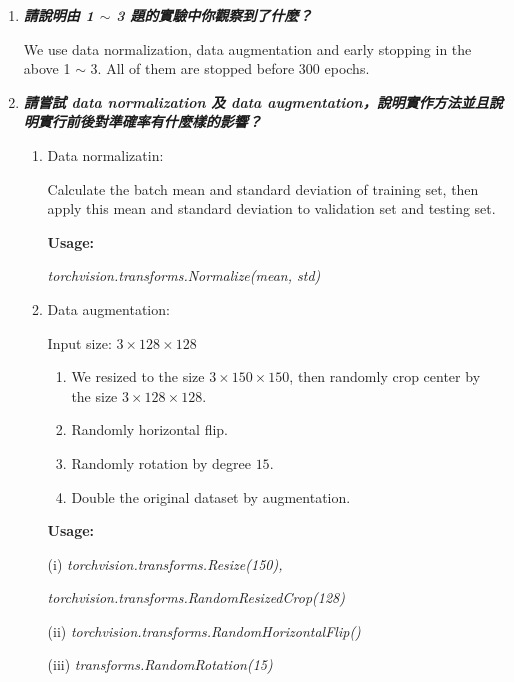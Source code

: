 \documentclass[a4paper,11pt]{article}
\begin{document}
\begin{enumerate}
\newpage

	\item \textit{\textbf{請說明由 1 $\sim$ 3 題的實驗中你觀察到了什麼？}}

	We use data normalization, data augmentation and early stopping in the above 1 $\sim$ 3. All of them are stopped before 300 epochs. 

	\item \textit{\textbf{請嘗試 data normalization 及 data augmentation，說明實作方法並且說明實行前後對準確率有什麼樣的影響？}}

	\begin{enumerate}
		\item Data normalizatin:

			Calculate the batch mean and standard deviation of training set, then apply this mean and standard deviation to validation set and testing set.

			\textbf{Usage:}

				\hspace{3cm} \textit{torchvision.transforms.Normalize(mean, std)}

		\item Data augmentation:

			Input size: $3 \times 128 \times 128$

			\begin{enumerate}
				\item[(i)] We resized to the size $3 \times 150 \times 150$, then randomly crop center by the size $3 \times 128 \times 128$.

				\item[(ii)] Randomly horizontal flip.

				\item[(iii)] Randomly rotation by degree $15$.

				\item[(iv)] Double the original dataset by augmentation.
			\end{enumerate}

			\textbf{Usage:}

				\hspace{3cm} (i) \textit{torchvision.transforms.Resize(150),}

    			\hspace{3.5cm}	\textit{torchvision.transforms.RandomResizedCrop(128)}

    			\hspace{3cm} (ii) \textit{torchvision.transforms.RandomHorizontalFlip()}

    			\hspace{3cm} (iii) \textit{transforms.RandomRotation(15)}


\end{enumerate}
\end{enumerate}
\end{document}
